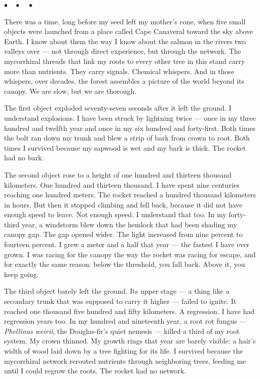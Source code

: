 \documentclass[12pt, letterpaper]{article}
\begin{document}
\begin{center}
$\bullet\quad\bullet\quad\bullet$
\end{center}

There was a time, long before my seed left my mother's cone, when five small objects were launched from a place called Cape Canaveral toward the sky above Earth. I know about them the way I know about the salmon in the rivers two valleys over --- not through direct experience, but through the network. The mycorrhizal threads that link my roots to every other tree in this stand carry more than nutrients. They carry signals. Chemical whispers. And in those whispers, over decades, the forest assembles a picture of the world beyond its canopy. We are slow, but we are thorough.

The first object exploded seventy-seven seconds after it left the ground. I understand explosions. I have been struck by lightning twice --- once in my three hundred and twelfth year and once in my six hundred and forty-first. Both times the bolt ran down my trunk and blew a strip of bark from crown to root. Both times I survived because my sapwood is wet and my bark is thick. The rocket had no bark.

The second object rose to a height of one hundred and thirteen thousand kilometers. One hundred and thirteen thousand. I have spent nine centuries reaching one hundred meters. The rocket reached a hundred thousand kilometers in hours. But then it stopped climbing and fell back, because it did not have enough speed to leave. Not enough speed. I understand that too. In my forty-third year, a windstorm blew down the hemlock that had been shading my canopy gap. The gap opened wider. The light increased from nine percent to fourteen percent. I grew a meter and a half that year --- the fastest I have ever grown. I was racing for the canopy the way the rocket was racing for escape, and for exactly the same reason: below the threshold, you fall back. Above it, you keep going.

The third object barely left the ground. Its upper stage --- a thing like a secondary trunk that was supposed to carry it higher --- failed to ignite. It reached one thousand five hundred and fifty kilometers. A regression. I have had regression years too. In my hundred and nineteenth year, a root rot fungus --- \textit{Phellinus weirii}, the Douglas-fir's quiet nemesis --- killed a third of my root system. My crown thinned. My growth rings that year are barely visible: a hair's width of wood laid down by a tree fighting for its life. I survived because the mycorrhizal network rerouted nutrients through neighboring trees, feeding me until I could regrow the roots. The rocket had no network.
\end{document}
